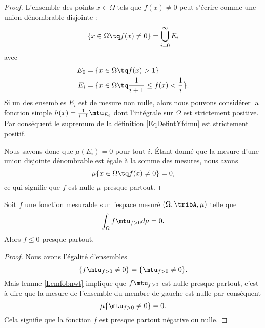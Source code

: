 \begin{proof}
    L'ensemble des points \( x\in\Omega\) tels que \( f(x)\neq 0\) peut s'écrire comme une union dénombrable disjointe :
    \begin{equation}
        \{ x\in\Omega\tq f(x)\neq 0 \}=\bigcup_{i=0}^{\infty}E_i
    \end{equation}
    avec
    \begin{subequations}
        \begin{align}
            E_0&=\{ x\in\Omega\tq f(x)>1 \}\\
            E_i&=\{ x\in\Omega\tq \frac{1}{ i+1 }\leq f(x)<\frac{1}{ i } \}.
        \end{align}
    \end{subequations}
    Si un des ensembles \( E_i\) est de mesure non nulle, alors nous pouvons considérer la fonction simple \( h(x)=\frac{1}{ i+1 }\mtu_{E_i}\) dont l'intégrale sur \( \Omega\) est strictement positive. Par conséquent le supremum de la définition \eqref{EqDefintYfdmu} est strictement positif.

    Nous savons donc que \( \mu(E_i)=0\) pour tout \( i\). Étant donné que la mesure d'une union disjointe dénombrable est égale à la somme des mesures, nous avons
    \begin{equation}
        \mu\{ x\in\Omega\tq f(x)\neq 0 \}=0,
    \end{equation}
    ce qui signifie que \( f\) est nulle \( \mu\)-presque partout.
\end{proof}

\begin{corollary}   \label{CorjLYiSm}
    Soit \( f\) une fonction mesurable sur l'espace mesuré \( (\Omega,\tribA,\mu)\) telle que
    \begin{equation}
        \int_{\Omega}f\mtu_{f>0}d\mu=0.
    \end{equation}
    Alors \( f\leq 0\) presque partout.
\end{corollary}

\begin{proof}
    Nous avons l'égalité d'ensembles
    \begin{equation}
        \{ f\mtu_{f>0}\neq 0 \}=\{ \mtu_{f>0}\neq 0 \}.
    \end{equation}
    Mais lemme \ref{Lemfobnwt} implique que \( f\mtu_{f>0}\) est nulle presque partout, c'est à dire que la mesure de l'ensemble du membre de gauche est nulle par conséquent
    \begin{equation}
        \mu\{ \mtu_{f>0}\neq 0 \}=0.
    \end{equation}
    Cela signifie que la fonction \( f\) est presque partout négative ou nulle.
\end{proof}

